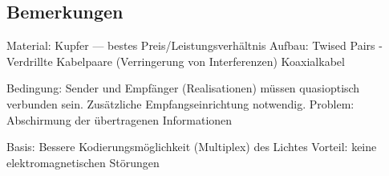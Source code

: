 \subsection{Bemerkungen}

Material: Kupfer — bestes Preis/Leistungsverhältnis
Aufbau: 
Twised Pairs - Verdrillte Kabelpaare (Verringerung von Interferenzen)
Koaxialkabel

Bedingung: Sender und Empfänger (Realisationen) müssen quasioptisch verbunden sein. Zusätzliche Empfangseinrichtung notwendig. 
Problem: Abschirmung der übertragenen Informationen

Basis: Bessere Kodierungsmöglichkeit (Multiplex) des Lichtes
Vorteil: keine elektromagnetischen Störungen

